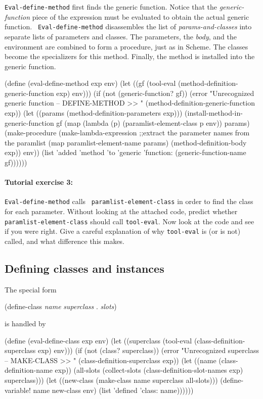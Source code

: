 {\tt Eval-define-method} first finds the generic function.  Notice
that the {\it generic-function} piece of the expression must be
evaluated to obtain the actual generic function.  {\tt
Eval-define-method} disassembles the list of {\it params-and-classes}
into separate lists of parameters and classes.  The parameters, the
{\it body}, and the environment are combined to form a procedure, just
as in Scheme.  The classes become the specializers for this method.
Finally, the method is installed into the generic function.

\beginlisp
(define (eval-define-method exp env)
  (let ((gf (tool-eval (method-definition-generic-function exp) env)))
    (if (not (generic-function? gf))
        (error "Unrecognized generic function -- DEFINE-METHOD >> "
               (method-definition-generic-function exp))
        (let ((params (method-definition-parameters exp)))
          (install-method-in-generic-function
           gf
           (map (lambda (p) (paramlist-element-class p env))
                params)
           (make-procedure (make-lambda-expression
                            ;;extract the parameter names from the paramlist
                            (map paramlist-element-name params)
                            (method-definition-body exp))
                           env))
          (list 'added 'method 'to 'generic 'function:
                (generic-function-name gf))))))
\endlisp

\paragraph{Tutorial exercise 3:} {\tt Eval-define-method} calls {\tt
paramlist-element-class} in order to find the class for each
parameter.  Without looking at the attached code, predict whether
{\tt paramlist-element-class} should call {\tt tool-eval}.  Now look
at the code and see if you were right.  Give a careful explanation of
why {\tt tool-eval} is (or is not) called, and what difference this
makes.

\subsection{Defining classes and instances}

The special form

\beginlisp
(define-class {\it name} {\it superclass} . {\it slots})
\endlisp

\noindent is handled by

\beginlisp
(define (eval-define-class exp env)
  (let ((superclass (tool-eval (class-definition-superclass exp)
                               env)))
    (if (not (class? superclass))
        (error "Unrecognized superclass -- MAKE-CLASS >> "
               (class-definition-superclass exp))
        (let ((name (class-definition-name exp))
              (all-slots (collect-slots
                          (class-definition-slot-names exp)
                          superclass)))
          (let ((new-class
                 (make-class name superclass all-slots)))
            (define-variable! name new-class env)
            (list 'defined 'class: name))))))
\endlisp

